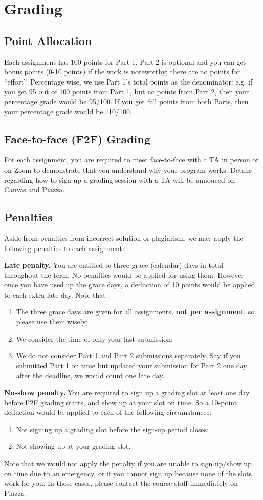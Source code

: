\documentclass[12pt]{exam}
\begin{document}
\section{Grading}
\subsection{Point Allocation}
Each assignment has 100 points for Part 1. Part 2 is optional and you can get bonus points (0-10 points) if the work is noteworthy; there are no points for ``effort''.
Percentage wise, we use Part 1's total points as the denominator: e.g. if you
get 95 out of 100 points from Part 1, but no points from Part 2, then your percentage
grade would be 95/100. If you get full points from both Parts, then your percentage
grade would be 110/100.

\subsection{Face-to-face (F2F) Grading}
For each assignment, you are required to meet face-to-face with a TA in person or on Zoom
to demonstrate that you understand why your program works. Details regarding how to
sign up a grading session with a TA will be annouced on Canvas and Piazza.

\subsection{Penalties}
Aside from penalties from incorrect solution or plagiarism, we may apply the following
penalties to each assignment:

\textbf{Late penalty.} You are entitled to three grace (calendar) days in total
throughout the term. No penalties would be applied for using them. However once
you have used up the grace days, a deduction of 10 points would be applied to each
extra late day. Note that
\begin{enumerate}
  \item The three grace days are given for all assignments, \textbf{not per assignment}, so please use them wisely;
  \item We consider the time of only your last submission;
  \item We do not consider Part 1 and Part 2 submissions separately. Say if you submitted Part 1 on time but updated your submission for Part 2 one day after the deadline, we would count one late day.
\end{enumerate}

\textbf{No-show penalty.} You are required to sign up a grading slot at least one day
before F2F grading starts, and show up at your slot on time. So a 10-point deduction would
be applied to each of the following circumstances:
\begin{enumerate}
  \item Not signing up a grading slot before the sign-up period closes;
  \item Not showing up at your grading slot.
\end{enumerate}
Note that we would not apply the penalty if you are unable to sign up/show up on time
due to an emergency, or if you cannot sign up because none of the slots work for you.
In those cases, please contact the course staff immediately on Piazza.
\end{document}
